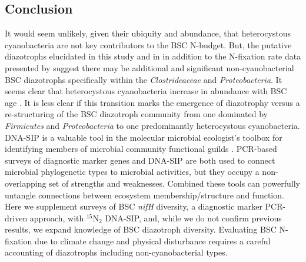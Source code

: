 \subsection{Conclusion}
It would seem unlikely, given their ubiquity and abundance, that heterocystous
cyanobacteria are not key contributors to the BSC N-budget. But, the putative
diazotrophs elucidated in this study and in \citet{Steppe_1996} in addition to
the N-fixation rate data presented by \citep{15643930} suggest there may be
additional and significant non-cyanobacterial BSC diazotrophs specifically
within the \textit{Clostrideaceae} and \textit{Proteobacteria}. It seems clear
that heterocystous cyanobacteria increase in abundance with BSC age
\citep{14766579}. It is less clear if this transition marks the emergence of
diazotrophy versus a re-structuring of the BSC diazotroph community from one
dominated by \textit{Firmicutes} and \textit{Proteobacteria} to one
predominantly heterocystous cyanobacteria. DNA-SIP is a valuable tool in the
molecular microbial ecologist's toolbox for identifying members of microbial
community functional guilds \cite{17446886}. PCR-based surveys of diagnostic marker genes
and DNA-SIP are both used to connect microbial phylogenetic types to microbial
activities, but they occupy a non-overlapping set of strengths and weaknesses.
Combined these tools can powerfully untangle connections between ecosystem
membership/structure and function. Here we supplement surveys of BSC
\textit{nifH} diversity, a diagnostic marker PCR-driven approach, with 
$^{15}$N$_{2}$ DNA-SIP, and, while we do not confirm previous results, we expand
knowledge of BSC diazotroph diversity. Evaluating BSC N-fixation due to climate
change and physical disturbance requires a careful accounting of diazotrophs
including non-cyanobacterial types. 
